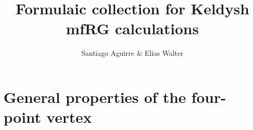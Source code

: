 \documentclass[12pt,a4paper,roman]{article}
\begin{document}
%
\title{Formulaic collection for Keldysh mfRG calculations}
%
%
\author{Santiago Aguirre \& Elias Walter}
%
%
%
\maketitle              %
%

%
%
%
\section*{General properties of the four-point vertex}
\end{document}
